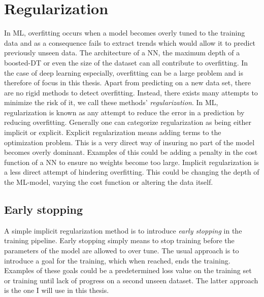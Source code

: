 \section{Regularization}\label{sec:Regularization}
In \ac{ML}, overfitting occurs when a model becomes overly tuned to the training data and as a consequence 
fails to extract trends which would allow it to predict previously unseen data. The architecture of a \ac{NN}, 
the maximum depth of a boosted-\ac{DT} or even the size of the dataset can all contribute to overfitting. In the 
case of deep learning especially, overfitting can be a large problem and is therefore of focus in this thesis. Apart 
from predicting on a new data set, there are no rigid methods to detect overfitting. Instead, there exists many 
attempts to minimize the risk of it, we call these methods' \emph{regularization}. In \ac{ML}, regularization 
is known as any attempt to reduce the error in a prediction by reducing overfitting. Generally one can categorize
regularization as being either implicit or explicit. Explicit regularization means adding terms to the optimization 
problem. This is a very direct way of insuring no part of the model becomes overly dominant. Examples of this 
could be adding a penalty in the cost function of a \ac{NN} to ensure no weights become too large. Implicit
regularization is a less direct attempt of hindering overfitting. This could be changing the depth of the \ac{ML}-model,
varying the cost function or altering the data itself.
\subsection{Early stopping}\label{subsec:EarlyStopping}
A simple implicit regularization method is to introduce \emph{early stopping} in the training pipeline. Early stopping 
simply means to stop training before the parameters of the model are allowed to over tune. The usual approach 
is to introduce a goal for the training, which when reached, ends the training. Examples of these goals could be a 
predetermined loss value on the training set or training until lack of progress on a second unseen dataset. The latter
approach is the one I will use in this thesis. 
